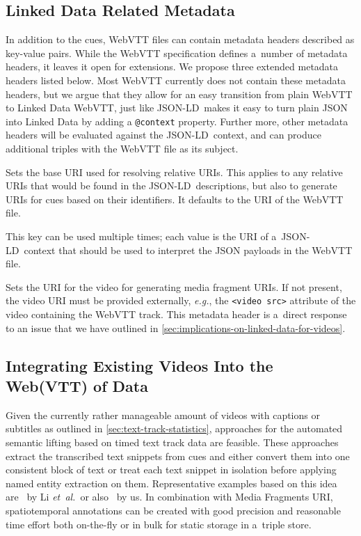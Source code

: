 \documentclass{sig-alternate}
\def\JSONLD{\mbox{JSON-LD}}
\begin{document}
\subsection{Linked Data Related Metadata}

In addition to the cues, WebVTT files can contain
metadata headers described as key-value pairs.
While the WebVTT specification defines a~number of metadata headers,
it leaves it open for extensions.
We propose three extended metadata headers listed below.
Most WebVTT currently does not contain
these metadata headers,
but we argue that they allow for an easy transition
from plain WebVTT to Linked Data WebVTT,
just like \JSONLD\ makes it easy to turn plain JSON into Linked Data
by adding a \texttt{@context} property.
Further more, other metadata headers will be evaluated
against the \JSONLD\ context,
and can produce additional triples with the WebVTT file as its subject.

\begin{description}[leftmargin=*]
  \item[@base]
  Sets the base URI used for resolving relative URIs.
  This applies to any relative URIs that would be found in the \JSONLD\ descriptions,
  but also to generate URIs for cues based on their identifiers.
  It defaults to the URI of the WebVTT file.
  \item[@context]
  This key can be used multiple times; each value is the URI
  of a~\JSONLD\ context that should be used to
  interpret the JSON payloads in the WebVTT file.
  \item[@video]
  Sets the URI for the video for generating media fragment URIs.
  If not present, the video URI must be provided externally,
  \emph{e.g.}, the \texttt{<video src>} attribute of the video
  containing the WebVTT track.
  This metadata header is a~direct response to an issue that we
  have outlined in \autoref{sec:implications-on-linked-data-for-videos}.
\end{description}

\subsection{Integrating Existing Videos Into the\\ Web(VTT) of Data}
\label{sec:integrating-existing-videos-into-the-web(vtt)-of-data}

Given the currently rather manageable amount of videos
with captions or subtitles as outlined in \autoref{sec:text-track-statistics},
approaches for the automated semantic lifting
based on timed text track data are feasible. 
These approaches extract the transcribed text snippets from cues
and either convert them into one consistent block of text
or treat each text snippet in isolation
before applying named entity extraction on them.
Representative examples based on this idea
are~\cite{li2013enriching,li2012creating,yi2012synote}
by Li \emph{et~al.}\ or also~\cite{steiner2010semwebvid} by us.
In combination with Media Fragments URI, spatiotemporal annotations
can be created with good precision and reasonable time effort
both on-the-fly or in bulk for static storage in a~triple store.
\end{document}
